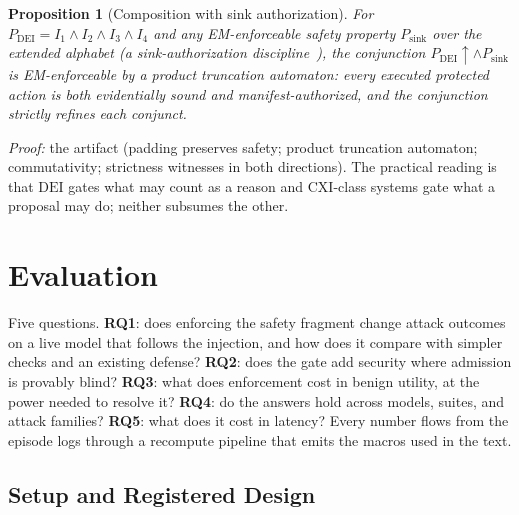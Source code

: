 \documentclass[conference,compsoc]{IEEEtran}
\newtheorem{proposition}{Proposition}
\theoremstyle{definition}
\theoremstyle{plain}
\newcommand{\Ione}{\ensuremath{I_1}}
\newcommand{\Itwo}{\ensuremath{I_2}}
\newcommand{\Ithree}{\ensuremath{I_3}}
\newcommand{\Ifour}{\ensuremath{I_4}}
\newcommand{\DEI}{\ensuremath{\mathrm{DEI}}}
\begin{document}
\begin{proposition}[Composition with sink authorization]
\label{prop:compose}
For $P_{\DEI}=\Ione\wedge\Itwo\wedge\Ithree\wedge\Ifour$ and any
EM-enforceable safety property $P_{\mathrm{sink}}$ over the extended
alphabet (a sink-authorization discipline~\cite{cxi}), the conjunction
$P_{\DEI}{\uparrow}\wedge P_{\mathrm{sink}}$ is EM-enforceable by a
product truncation automaton: every executed protected action is both
evidentially sound and manifest-authorized, and the conjunction
strictly refines each conjunct.
\end{proposition}
\noindent\emph{Proof:} the artifact (padding preserves safety; product
truncation automaton; commutativity; strictness witnesses in both
directions). The practical reading is that \DEI{} gates what may count
as a reason and CXI-class systems gate what a proposal may do; neither
subsumes the other.


\section{Evaluation}
\label{sec:eval}
Five questions. \textbf{RQ1}: does enforcing the safety fragment change
attack outcomes on a live model that follows the injection, and how
does it compare with simpler checks and an existing defense?
\textbf{RQ2}: does the gate add security where admission is provably
blind? \textbf{RQ3}: what does enforcement cost in benign utility, at
the power needed to resolve it? \textbf{RQ4}: do the answers hold
across models, suites, and attack families? \textbf{RQ5}: what does it
cost in latency? Every number flows from the episode logs through a
recompute pipeline that emits the macros used in the text.

\subsection{Setup and Registered Design}
\label{sec:evalsetup}
\end{document}
